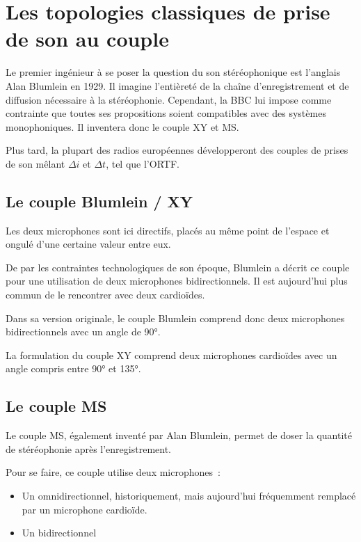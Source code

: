 \documentclass[
]{book}
\providecommand{\tightlist}{%
  \setlength{\itemsep}{0pt}\setlength{\parskip}{0pt}}
\begin{document}
\hypertarget{les-topologies-classiques-de-prise-de-son-au-couple}{%
\section{Les topologies classiques de prise de son au couple}\label{les-topologies-classiques-de-prise-de-son-au-couple}}

Le premier ingénieur à se poser la question du son stéréophonique est l'anglais Alan Blumlein en 1929. Il imagine l'entièreté de la chaîne d'enregistrement et de diffusion nécessaire à la stéréophonie. Cependant, la BBC lui impose comme contrainte que toutes ses propositions soient compatibles avec des systèmes monophoniques. Il inventera donc le couple XY et MS.

Plus tard, la plupart des radios européennes développeront des couples de prises de son mêlant \(\Delta i\) et \(\Delta t\), tel que l'ORTF.

\hypertarget{le-couple-blumlein-xy}{%
\subsection{Le couple Blumlein / XY}\label{le-couple-blumlein-xy}}

Les deux microphones sont ici directifs, placés au même point de l'espace et ongulé d'une certaine valeur entre eux.

De par les contraintes technologiques de son époque, Blumlein a décrit ce couple pour une utilisation de deux microphones bidirectionnels. Il est aujourd'hui plus commun de le rencontrer avec deux cardioïdes.

Dans sa version originale, le couple Blumlein comprend donc deux microphones bidirectionnels avec un angle de 90°.

La formulation du couple XY comprend deux microphones cardioïdes avec un angle compris entre 90° et 135°.

\hypertarget{le-couple-ms}{%
\subsection{Le couple MS}\label{le-couple-ms}}

Le couple MS, également inventé par Alan Blumlein, permet de doser la quantité de stéréophonie après l'enregistrement.

Pour se faire, ce couple utilise deux microphones~:

\begin{itemize}
\tightlist
\item
  Un omnidirectionnel, historiquement, mais aujourd'hui fréquemment remplacé par un microphone cardioïde.
\item
  Un bidirectionnel
\end{itemize}
\end{document}
